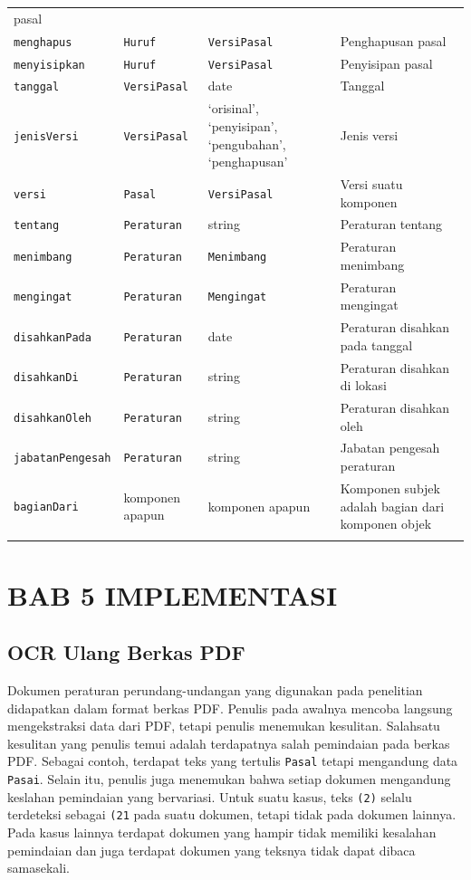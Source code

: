 \begin{longtable}[c]{@{}llll@{}}
pasal
\\\addlinespace
\texttt{menghapus} & \texttt{Huruf} & \texttt{VersiPasal} & Penghapusan
pasal
\\\addlinespace
\texttt{menyisipkan} & \texttt{Huruf} & \texttt{VersiPasal} & Penyisipan
pasal
\\\addlinespace
\texttt{tanggal} & \texttt{VersiPasal} & date & Tanggal
\\\addlinespace
\texttt{jenisVersi} & \texttt{VersiPasal} & `orisinal', `penyisipan',
`pengubahan', `penghapusan' & Jenis versi
\\\addlinespace
\texttt{versi} & \texttt{Pasal} & \texttt{VersiPasal} & Versi suatu
komponen
\\\addlinespace
\texttt{tentang} & \texttt{Peraturan} & string & Peraturan tentang
\\\addlinespace
\texttt{menimbang} & \texttt{Peraturan} & \texttt{Menimbang} & Peraturan
menimbang
\\\addlinespace
\texttt{mengingat} & \texttt{Peraturan} & \texttt{Mengingat} & Peraturan
mengingat
\\\addlinespace
\texttt{disahkanPada} & \texttt{Peraturan} & date & Peraturan disahkan
pada tanggal
\\\addlinespace
\texttt{disahkanDi} & \texttt{Peraturan} & string & Peraturan disahkan
di lokasi
\\\addlinespace
\texttt{disahkanOleh} & \texttt{Peraturan} & string & Peraturan disahkan
oleh
\\\addlinespace
\texttt{jabatanPengesah} & \texttt{Peraturan} & string & Jabatan
pengesah peraturan
\\\addlinespace
\texttt{bagianDari} & komponen apapun & komponen apapun & Komponen
subjek adalah bagian dari komponen objek
\\\addlinespace
\bottomrule
\end{longtable}

\section{BAB 5 IMPLEMENTASI}\label{bab-5-implementasi}

\subsection{OCR Ulang Berkas PDF}\label{ocr-ulang-berkas-pdf}

Dokumen peraturan perundang-undangan yang digunakan pada penelitian
didapatkan dalam format berkas PDF. Penulis pada awalnya mencoba
langsung mengekstraksi data dari PDF, tetapi penulis menemukan
kesulitan. Salahsatu kesulitan yang penulis temui adalah terdapatnya
salah pemindaian pada berkas PDF. Sebagai contoh, terdapat teks yang
tertulis \texttt{Pasal} tetapi mengandung data \texttt{Pasai}. Selain
itu, penulis juga menemukan bahwa setiap dokumen mengandung keslahan
pemindaian yang bervariasi. Untuk suatu kasus, teks \texttt{(2)} selalu
terdeteksi sebagai \texttt{(21} pada suatu dokumen, tetapi tidak pada
dokumen lainnya. Pada kasus lainnya terdapat dokumen yang hampir tidak
memiliki kesalahan pemindaian dan juga terdapat dokumen yang teksnya
tidak dapat dibaca samasekali.

